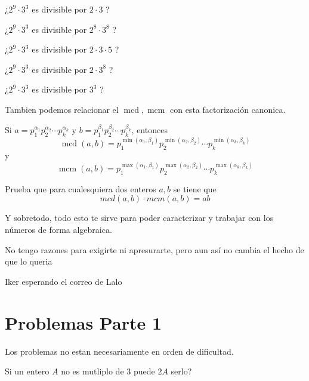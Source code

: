 \documentclass[11pt]{scrartcl}
\newcommand{\mcd}{\operatorname{mcd}}
\newcommand{\mcm}{\operatorname{mcm}}
\begin{document}
\begin{exercise} ¿$2^9\cdot 3^3 $ es divisible  por $2\cdot 3$ ?\end{exercise}
\begin{exercise} ¿$2^9\cdot 3^3 $ es divisible  por $2^8\cdot 3^8$ ?\end{exercise}
\begin{exercise} ¿$2^9\cdot 3^3 $ es divisible  por $2\cdot 3\cdot 5$ ?\end{exercise}
\begin{exercise} ¿$2^9\cdot 3^3 $ es divisible  por $2\cdot 3^8$ ?\end{exercise}
\begin{exercise} ¿$2^9\cdot 3^3 $ es divisible  por $3^3$ ?\end{exercise}

Tambien podemos relacionar el $\mcd, \mcm$ con esta factorización canonica.

Si $a=p_1^{\alpha_1}p_2^{\alpha_2}\cdots p_k^{\alpha_k}$ y $b=p_1^{\beta_1}p_2^{\beta_2}\cdots p_k^{\beta_k}$, entonces 
$$\mcd(a,b)=p_1^{\min(\alpha_1,\beta_1)}p_2^{\min(\alpha_2,\beta_2)}\cdots p_k^{\min(\alpha_k,\beta_k)}$$
y 
$$\mcm(a,b)=p_1^{\max(\alpha_1,\beta_1)}p_2^{\max(\alpha_2,\beta_2)}\cdots p_k^{\max(\alpha_k,\beta_k)}$$

\begin{exercise}
Prueba que para cualesquiera dos enteros $a,b$ se tiene que 
$$mcd(a,b)\cdot mcm(a,b)=ab$$
\end{exercise}

Y sobretodo, todo esto te sirve para poder caracterizar y trabajar con los n\'umeros de forma algebraica. 


\newpage

\epigraph{No tengo razones para exigirte ni apresurarte, pero aun as\'i no cambia el hecho de que lo queria}{Iker esperando el correo de Lalo}


\section{Problemas Parte 1}
Los problemas no estan necesariamente en orden de dificultad.
\begin{problem}
	Si un entero $A$ no es mutliplo de 3 puede $2A$ serlo?
\end{problem}
\end{document}
